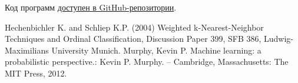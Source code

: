 \documentclass[a4paper,12pt]{article} %
\begin{document}
Код программ \href{https://github.com/zuevval/source/tree/master/r/ml/knn}{доступен в GitHub-репозитории}.


\begin{thebibliography}{99}
     Hechenbichler K. and Schliep K.P. (2004) Weighted k-Nearest-Neighbor Techniques and Ordinal Classification, Discussion Paper 399, SFB 386, Ludwig-Maximilians University Munich.
     Murphy, Kevin P. Machine learning: a probabilistic perspective.: Kevin P. Murphy. -- Cambridge, Massachusetts: The MIT Press, 2012.
\end{thebibliography}
\end{document}
